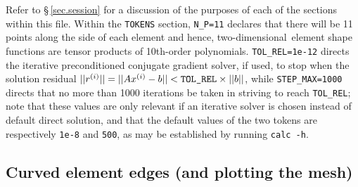 \documentclass[11pt]{report}
\newcommand\twod{two-di\-men\-sion\-al}
\begin{document}
Refer to \S\,\ref{sec.session} for a discussion of the purposes of
each of the sections within this file.  Within the \verb|TOKENS|
section, \verb|N_P=11| declares that there will be 11 points along the
side of each element and hence, \twod\ element shape functions are
tensor products of 10th-order polynomials.  \verb|TOL_REL=1e-12|
directs the iterative preconditioned conjugate gradient solver, if
used, to stop when the solution residual $||r^{(i)}|| = ||A x^{(i)} -
b|| < \verb|TOL_REL|\times||b||$, while \verb|STEP_MAX=1000| directs that
no more than 1000 iterations be taken in striving to reach
\verb|TOL_REL|; note that these values are only relevant if an
iterative solver is chosen instead of default direct solution, and
that the default values of the two tokens are respectively \verb|1e-8|
and \verb|500|, as may be established by running \verb|calc -h|.

\subsection{Curved element edges (and plotting the mesh)}
\label{sec.curves}
\end{document}
